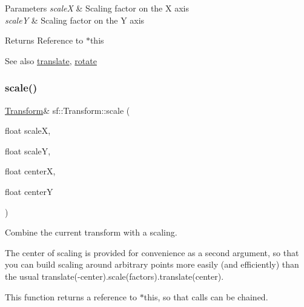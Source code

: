 \begin{DoxyParams}{Parameters}
{\em scaleX} & Scaling factor on the X axis \\
\hline
{\em scaleY} & Scaling factor on the Y axis\\
\hline
\end{DoxyParams}
\begin{DoxyReturn}{Returns}
Reference to $\ast$this
\end{DoxyReturn}
\begin{DoxySeeAlso}{See also}
\mbox{\hyperlink{classsf_1_1_transform_ab54f6c8070cc05e2afcb3145fbf4395a}{translate}}, \mbox{\hyperlink{classsf_1_1_transform_a3e548c3c9e3fb9d4bd43cf852669e555}{rotate}} \begin{DoxyVerb}\end{DoxyVerb}
 
\end{DoxySeeAlso}
\mbox{\label{classsf_1_1_transform_a6eaeedd35e289cb17f9bf7f24dc28daa}} 
\subsubsection{\texorpdfstring{scale()}{scale()}\hspace{0.1cm}{\footnotesize\ttfamily [2/4]}}
{\footnotesize\ttfamily \mbox{\hyperlink{classsf_1_1_transform}{Transform}}\& sf\+::\+Transform\+::scale (\begin{DoxyParamCaption}\item[{float}]{scaleX,  }\item[{float}]{scaleY,  }\item[{float}]{centerX,  }\item[{float}]{centerY }\end{DoxyParamCaption})}



Combine the current transform with a scaling. 

The center of scaling is provided for convenience as a second argument, so that you can build scaling around arbitrary points more easily (and efficiently) than the usual translate(-\/center).scale(factors).translate(center).

This function returns a reference to $\ast$this, so that calls can be chained. 
\begin{DoxyCode}{0}
\end{DoxyCode}



